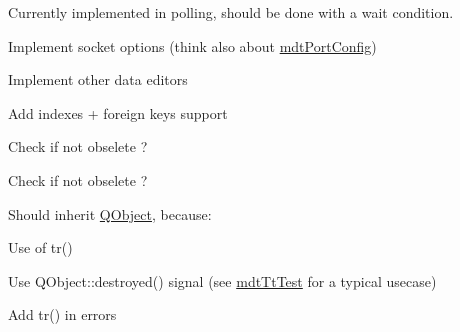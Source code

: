 \begin{DoxyRefList}
\item[\label{todo__todo000032}%
\hypertarget{todo__todo000032}{}%
Member \hyperlink{classmdt_port_thread_helper_aed853f4cedc143c62e7dad5e38ff4b8c}{mdt\-Port\-Thread\-Helper\-:\-:get\-New\-Frame\-Read} ()]Currently implemented in polling, should be done with a wait condition. 
\item[\label{todo__todo000033}%
\hypertarget{todo__todo000033}{}%
Member \hyperlink{classmdt_port_thread_helper_socket_aa77afb8d26e4863bd437e0d59efae7a7}{mdt\-Port\-Thread\-Helper\-Socket\-:\-:mdt\-Port\-Thread\-Helper\-Socket} (\hyperlink{class_q_object}{Q\-Object} $\ast$parent=0)]Implement socket options (think also about \hyperlink{classmdt_port_config}{mdt\-Port\-Config})  
\item[\label{todo__todo000080}%
\hypertarget{todo__todo000080}{}%
Class \hyperlink{classmdt_sql_field_handler_label}{mdt\-Sql\-Field\-Handler\-Label} ]Implement other data editors  
\item[\label{todo__todo000004}%
\hypertarget{todo__todo000004}{}%
Member \hyperlink{classmdt_sql_schema_table_a2cea444ccb26b0802fb230db5460e167}{mdt\-Sql\-Schema\-Table\-:\-:setup\-From\-Table} (const Q\-String \&name, Q\-Sql\-Database db)]Add indexes + foreign keys support  
\item[\label{todo__todo000083}%
\hypertarget{todo__todo000083}{}%
Class \hyperlink{classmdt_sql_table_model}{mdt\-Sql\-Table\-Model} ]Check if not obselete ?  
\item[\label{todo__todo000082}%
\hypertarget{todo__todo000082}{}%
Member \hyperlink{classmdt_sql_table_model_ad423c1b0c74ecbbb575637b028c2574b}{mdt\-Sql\-Table\-Model\-:\-:mdt\-Sql\-Table\-Model} (\hyperlink{class_q_object}{Q\-Object} $\ast$parent=0, Q\-Sql\-Database db=Q\-Sql\-Database())]Check if not obselete ?  
\item[\label{todo__todo000055}%
\hypertarget{todo__todo000055}{}%
Class \hyperlink{classmdt_tt_base}{mdt\-Tt\-Base} ]Should inherit \hyperlink{class_q_object}{Q\-Object}, because\-:
\begin{DoxyItemize}
\item Use of tr()
\item Use Q\-Object\-::destroyed() signal (see \hyperlink{classmdt_tt_test}{mdt\-Tt\-Test} for a typical usecase)  
\end{DoxyItemize}
\item[\label{todo__todo000054}%
\hypertarget{todo__todo000054}{}%
Member \hyperlink{classmdt_tt_base_a6dbd221d1518e30c3692a7ba54b57c03}{mdt\-Tt\-Base\-:\-:mdt\-Tt\-Base} (\hyperlink{class_q_object}{Q\-Object} $\ast$parent, Q\-Sql\-Database db)]Add tr() in errors  

\end{DoxyRefList}
